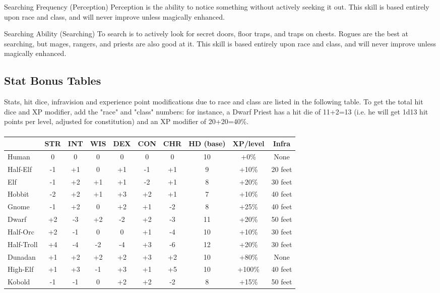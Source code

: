           Searching Frequency (Perception)
               Perception is the ability to notice something without
               actively seeking it out. This skill is based entirely upon
               race and class, and will never improve unless magically
               enhanced.

          Searching Ability (Searching)
               To search is to actively look for secret doors, floor traps,
               and traps on chests. Rogues are the best at searching, but
               mages, rangers, and priests are also good at it. This skill
               is based entirely upon race and class, and will never
               improve unless magically enhanced.


 
\subsection{Stat Bonus Tables}

Stats, hit dice, infravision and experience point modifications due to
race and class are listed in the following table. To get the total hit
dice and XP modifier, add the "race" and "class" numbers: for instance,
a Dwarf Priest has a hit die of 11+2=13 (i.e. he will get 1d13 hit
points per level, adjusted for constitution) and an XP modifier of
20+20=40\%.

\paragraph{}
\begin{tabular}{|l|c|c|c|c|c|c|c|c|c|}
\hline
       & STR & INT & WIS & DEX & CON & CHR & HD (base) & XP/level &
       Infra\\
\hline
Human      & 0  & 0  & 0  & 0  & 0  & 0  & 10 & +0\%   & None\\
Half-Elf   & -1 & +1 & 0  & +1 & -1 & +1 & 9  & +10\%  & 20 feet\\
Elf        & -1 & +2 & +1 & +1 & -2 & +1 & 8  & +20\%  & 30 feet\\
Hobbit     & -2 & +2 & +1 & +3 & +2 & +1 & 7  & +10\%  & 40 feet\\
Gnome      & -1 & +2 & 0  & +2 & +1 & -2 & 8  & +25\%  & 40 feet\\
Dwarf      & +2 & -3 & +2 & -2 & +2 & -3 & 11 & +20\%  & 50 feet\\
Half-Orc   & +2 & -1 & 0  & 0  & +1 & -4 & 10 & +10\%  & 30 feet\\
Half-Troll & +4 & -4 & -2 & -4 & +3 & -6 & 12 & +20\%  & 30 feet\\
Dunadan    & +1 & +2 & +2 & +2 & +3 & +2 & 10 & +80\%  & None\\
High-Elf   & +1 & +3 & -1 & +3 & +1 & +5 & 10 & +100\% & 40 feet\\
Kobold     & -1 & -1 & 0  & +2 & +2 & -2 & 8  & +15\%  & 50 feet\\
\hline
\end{tabular}

